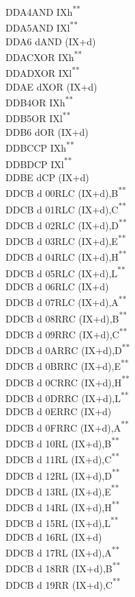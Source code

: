 \documentclass[12pt,twoside,openright,a4paper]{book}
\newcommand{\UNDOC}{\textnormal{\textsuperscript{**}}}
\begin{document}
\begin{multicols}{3}
{\begin{tabbing}
	DDA4\>AND IXh\UNDOC\\
	DDA5\>AND IXl\UNDOC\\
	DDA6 d\>AND (IX+d)\\
	DDAC\>XOR IXh\UNDOC\\
	DDAD\>XOR IXl\UNDOC\\
	DDAE d\>XOR (IX+d)\\
	DDB4\>OR IXh\UNDOC\\
	DDB5\>OR IXl\UNDOC\\
	DDB6 d\>OR (IX+d)\\
	DDBC\>CP IXh\UNDOC\\
	DDBD\>CP IXl\UNDOC\\
	DDBE d\>CP (IX+d)\\
	DDCB d 00\>RLC (IX+d),B\UNDOC\\
	DDCB d 01\>RLC (IX+d),C\UNDOC\\
	DDCB d 02\>RLC (IX+d),D\UNDOC\\
	DDCB d 03\>RLC (IX+d),E\UNDOC\\
	DDCB d 04\>RLC (IX+d),H\UNDOC\\
	DDCB d 05\>RLC (IX+d),L\UNDOC\\
	DDCB d 06\>RLC (IX+d)\\
	DDCB d 07\>RLC (IX+d),A\UNDOC\\
	DDCB d 08\>RRC (IX+d),B\UNDOC\\
	DDCB d 09\>RRC (IX+d),C\UNDOC\\
	DDCB d 0A\>RRC (IX+d),D\UNDOC\\
	DDCB d 0B\>RRC (IX+d),E\UNDOC\\
	DDCB d 0C\>RRC (IX+d),H\UNDOC\\
	DDCB d 0D\>RRC (IX+d),L\UNDOC\\
	DDCB d 0E\>RRC (IX+d)\\
	DDCB d 0F\>RRC (IX+d),A\UNDOC\\
	DDCB d 10\>RL (IX+d),B\UNDOC\\
	DDCB d 11\>RL (IX+d),C\UNDOC\\
	DDCB d 12\>RL (IX+d),D\UNDOC\\
	DDCB d 13\>RL (IX+d),E\UNDOC\\
	DDCB d 14\>RL (IX+d),H\UNDOC\\
	DDCB d 15\>RL (IX+d),L\UNDOC\\
	DDCB d 16\>RL (IX+d)\\
	DDCB d 17\>RL (IX+d),A\UNDOC\\
	DDCB d 18\>RR (IX+d),B\UNDOC\\
	DDCB d 19\>RR (IX+d),C\UNDOC\\

\end{tabbing}}
\end{multicols}
\end{document}
